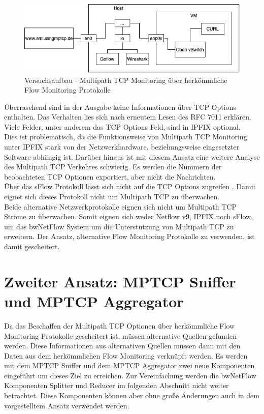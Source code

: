\documentclass[a4paper, 12pt]{article}
\begin{document}
\begin{figure}[H]
    \centering
    \includegraphics[width=1\textwidth]{images/flowmonitoringmptcp.png}
    \caption{Versuchsaufbau - Multipath TCP Monitoring über herkömmliche Flow Monitoring Protokolle}
    \label{fig:flowmonitoringmptcp}
\end{figure}

Überraschend sind in der Ausgabe keine Informationen über TCP Options enthalten.
Das Verhalten lies sich nach erneutem Lesen des RFC 7011 erklären.
Viele Felder, unter anderem das TCP Options Feld, sind in IPFIX optional.
\\
Dies ist problematisch, da die Funktionsweise von Multipath TCP Monitoring unter IPFIX stark von der Netzwerkhardware, beziehungsweise eingesetzter Software abhängig ist.
Darüber hinaus ist mit diesem Ansatz eine weitere Analyse des Multipath TCP Verkehres schwierig. Es werden die Nummern der beobachteten TCP Optionen exportiert, aber nicht die Nachrichten.  
\\
Über das sFlow Protokoll lässt sich nicht auf die TCP Options zugreifen \cite{phaal2001rfc3176}. Damit eignet sich dieses Protokoll nicht um Multipath TCP zu überwachen.
\\
Beide alternative Netzwerkprotokolle eignen sich nicht um Multipath TCP Ströme zu überwachen.
Somit eignen sich weder Netflow v9, IPFIX noch sFlow, um das bwNetFlow System um die Unterstützung von Multipath TCP zu erweitern.
Der Ansatz, alternative Flow Monitoring Protokolle zu verwenden, ist damit gescheitert.

\section{Zweiter Ansatz: MPTCP Sniffer und MPTCP Aggregator}
Da das Beschaffen der Multipath TCP Optionen über herkömmliche Flow Monitoring Protokolle gescheitert ist, müssen alternative Quellen gefunden werden.
Diese Informationen aus alternativen Quellen müssen dann mit den Daten aus dem herkömmlichen Flow Monitoring verknüpft werden. 
Es werden mit dem MPTCP Sniffer und dem MPTCP Aggregator zwei neue Komponenten eingeführt um dieses Ziel zu erreichen.
Zur Vereinfachung werden die bwNetFlow Komponenten Splitter und Reducer im folgenden Abschnitt nicht weiter betrachtet.
Diese Komponenten können aber ohne große Änderungen auch in dem vorgestelltem Ansatz verwendet werden.
\end{document}
